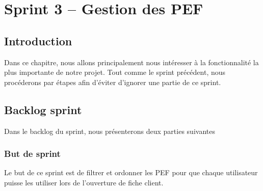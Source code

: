 \chapter{Sprint 3 – Gestion des PEF}
	
\section*{Introduction}
Dans ce chapitre, nous allons principalement nous intéresser à la fonctionnalité la plus  importante de notre projet. Tout comme le sprint précédent, nous procéderons par étapes afin d’éviter d’ignorer une partie de ce sprint.

\section{Backlog sprint}
Dans le backlog du sprint, nous présenterons deux parties suivantes
\subsection{But de sprint}
Le but de ce sprint est de filtrer et ordonner les PEF pour que chaque utilisateur puisse les utiliser lors de l’ouverture de fiche client.
